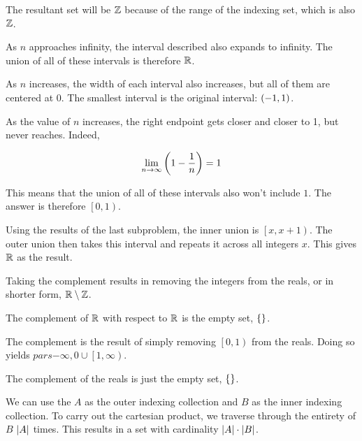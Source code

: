 \documentclass{article}
\begin{document}
\problem

The resultant set will be $\mathbb Z$ because of the range of the indexing set, which is also $\mathbb Z$.

As $n$ approaches infinity, the interval described also expands to infinity.
The union of all of these intervals is therefore $\mathbb R$.

As $n$ increases, the width of each interval also increases, but all of them are centered at $0$.
The smallest interval is the original interval: $\left (-1, 1 \right)$.

\subproblemat{$\bigcup \limits_{n = 2}^\infty [0, 1 - 1/n)$}
As the value of $n$ increases, the right endpoint gets closer and closer to 1, but never reaches.
Indeed,

$$
\lim_{n \to \infty} \left (1 - \frac{1}{n} \right) = 1
$$

This means that the union of all of these intervals also won't include $1$.
The answer is therefore $ \left [0, 1 \right)$.

\subproblemat{$\bigcup \limits_{x \in \mathbb{Z}} \pars{ \bigcup \limits_{n = 2} ^\infty \left [x, x + 1 - 1/n \right)}$}
Using the results of the last subproblem, the inner union is $\left [x, x + 1 \right)$.
The outer union then takes this interval and repeats it across all integers $x$.
This gives $\mathbb R$ as the result.

\problem{}
Taking the complement results in removing the integers from the reals, or in shorter form, $\mathbb R \setminus \mathbb Z$.

The complement of $\mathbb R$ with respect to $\mathbb R$ is the empty set, $\left \{  \right \}$.

\subproblemat{$\pars{\bigcup \limits_{n = 2}^\infty [0, 1 - 1/n)}^C$}
The complement is the result of simply removing $\left [ 0, 1 \right )$ from the reals.
Doing so yields $pars{-\infty, 0} \cup \left [ 1, \infty \right )$.

\subproblemat{$\pars{\bigcup \limits_{x \in \mathbb{Z}} \pars{ \bigcup \limits_{n = 2} ^\infty \left [x, x + 1 - 1/n \right)}}^C$}
The complement of the reals is just the empty set, $\left \{  \right \}$.

\problem

We can use the $A$ as the outer indexing collection and $B$ as the inner indexing collection.
To carry out the cartesian product, we traverse through the entirety of $B$ $\left\lvert A \right\rvert$ times.
This results in a set with cardinality $\left\lvert A \right\rvert \cdot \left\lvert B \right\rvert$.
\end{document}
